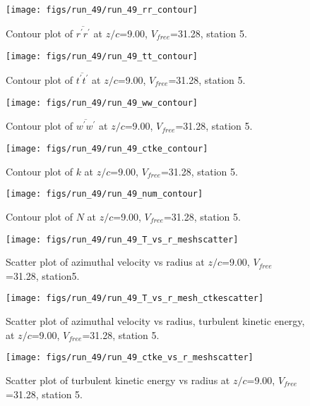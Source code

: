\begin{figure}[H]
\centering
\texttt{[image: figs/run\_49/run\_49\_rr\_contour]}
\caption{Contour plot of $\overline{r^\prime r^\prime}$ at $z/c$=9.00, $V_{free}$=31.28, station 5.}
\label{fig:run_49_rr_contour}
\end{figure}


\begin{figure}[H]
\centering
\texttt{[image: figs/run\_49/run\_49\_tt\_contour]}
\caption{Contour plot of $\overline{t^\prime t^\prime}$ at $z/c$=9.00, $V_{free}$=31.28, station 5.}
\label{fig:run_49_tt_contour}
\end{figure}


\begin{figure}[H]
\centering
\texttt{[image: figs/run\_49/run\_49\_ww\_contour]}
\caption{Contour plot of $\overline{w^\prime w^\prime}$ at $z/c$=9.00, $V_{free}$=31.28, station 5.}
\label{fig:run_49_ww_contour}
\end{figure}


\begin{figure}[H]
\centering
\texttt{[image: figs/run\_49/run\_49\_ctke\_contour]}
\caption{Contour plot of $k$ at $z/c$=9.00, $V_{free}$=31.28, station 5.}
\label{fig:run_49_ctke_contour}
\end{figure}


\begin{figure}[H]
\centering
\texttt{[image: figs/run\_49/run\_49\_num\_contour]}
\caption{Contour plot of $N$ at $z/c$=9.00, $V_{free}$=31.28, station 5.}
\label{fig:run_49_num_contour}
\end{figure}


\begin{figure}[H]
\centering
\texttt{[image: figs/run\_49/run\_49\_T\_vs\_r\_meshscatter]}
\caption{Scatter plot of azimuthal velocity vs radius at $z/c$=9.00, $V_{free}$=31.28, station5.}
\label{fig:run_49_T_vs_r_meshscatter}
\end{figure}


\begin{figure}[H]
\centering
\texttt{[image: figs/run\_49/run\_49\_T\_vs\_r\_mesh\_ctkescatter]}
\caption{Scatter plot of azimuthal velocity vs radius, turbulent kinetic energy, at $z/c$=9.00, $V_{free}$=31.28, station 5.}
\label{fig:run_49_T_vs_r_mesh_ctkescatter}
\end{figure}


\begin{figure}[H]
\centering
\texttt{[image: figs/run\_49/run\_49\_ctke\_vs\_r\_meshscatter]}
\caption{Scatter plot of turbulent kinetic energy vs radius at $z/c$=9.00, $V_{free}$=31.28, station 5.}
\label{fig:run_49_ctke_vs_r_meshscatter}
\end{figure}


